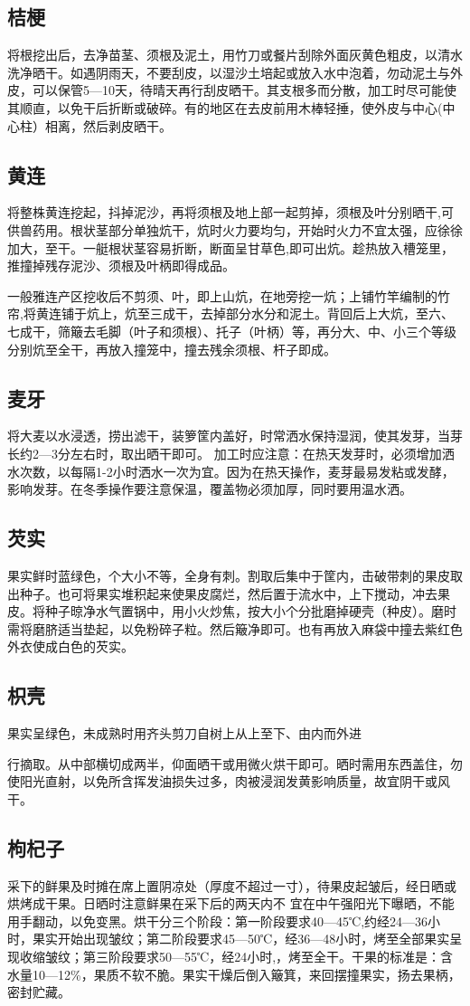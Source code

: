 \documentclass{ctexbook}
\begin{document}
\subsection{桔梗}
将根挖出后，去净苗茎、须根及泥土，用竹刀或餐片刮除外面灰黄色粗皮，以清水洗净晒干。如遇阴雨天，不要刮皮，以湿沙土培起或放入水中泡着，勿动泥土与外皮，可以保管5—10天，待晴天再行刮皮晒干。其支根多而分散，加工时尽可能使其顺直，以免干后折断或破碎。有的地区在去皮前用木棒轻捶，使外皮与中心(中心柱）相离，然后剥皮晒干。
\subsection{黄连}
将整株黄连挖起，抖掉泥沙，再将须根及地上部一起剪掉，须根及叶分别晒干,可供兽药用。根状茎部分单独炕干，炕时火力要均匀，开始时火力不宜太强，应徐徐加大，至干。一艇根状茎容易折断，断面呈甘草色,即可出炕。趁热放入槽笼里，推撞掉残存泥沙、须根及叶柄即得成品。

一般雅连产区挖收后不剪须、叶，即上山炕，在地旁挖一炕；上铺竹竿编制的竹帘,将黄连铺于炕上，炕至三成干，去掉部分水分和泥土。背回后上大炕，至六、七成干，筛簸去毛脚（叶子和须根）、托子（叶柄）等，再分大、中、小三个等级分别炕至全干，再放入撞笼中，撞去残余须根、杆子即成。
\subsection{麦牙}
将大麦以水浸透，捞出滤干，装箩筐内盖好，时常洒水保持湿润，使其发芽，当芽长约2—3分左右时，取出晒干即可。
加工时应注意：在热天发芽时，必须增加洒水次数，以每隔1-2小时洒水一次为宜。因为在热天操作，麦芽最易发粘或发酵，影响发芽。在冬季操作要注意保温，覆盖物必须加厚，同时要用温水洒。
\subsection{芡实}
果实鲜时蓝绿色，个大小不等，全身有刺。割取后集中于筐内，击破带刺的果皮取出种子。也可将果实堆积起来使果皮腐烂，然后置于流水中，上下搅动，冲去果皮。将种子晾净水气置锅中，用小火炒焦，按大小个分批磨掉硬壳（种皮）。磨时需将磨脐适当垫起，以免粉碎子粒。然后簸净即可。也有再放入麻袋中撞去紫红色外衣使成白色的芡实。
\subsection{枳壳}
果实呈绿色，未成熟时用齐头剪刀自树上从上至下、由内而外进

行摘取。从中部横切成两半，仰面晒干或用微火烘干即可。晒时需用东西盖住，勿使阳光直射，以免所含挥发油损失过多，肉被浸润发黄影响质量，故宜阴干或风干。
\subsection{枸杞子}
采下的鲜果及时摊在席上置阴凉处（厚度不超过一寸），待果皮起皱后，经日晒或烘烤成干果。日晒时注意鲜果在采下后的两天内不
宜在中午强阳光下曝晒，不能用手翻动，以免变黑。烘干分三个阶段：第一阶段要求40—45℃,约经24—36小时，果实开始出现皱纹；第二阶段要求45—50℃，经36—48小时，烤至全部果实呈现收缩皱纹；第三阶段要求50—55℃，经24小时,，烤至全干。干果的标准是：含水量10—12\%，果质不软不脆。果实干燥后倒入簸箕，来回摆撞果实，扬去果柄，密封贮藏。
\end{document}
